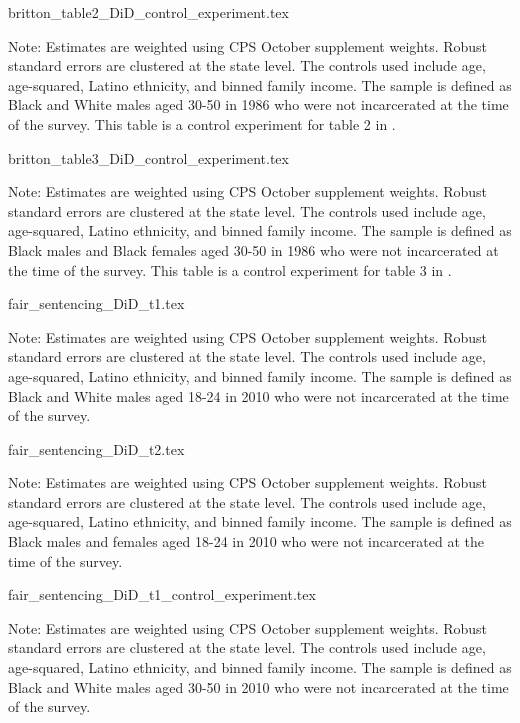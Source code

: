 \clearpage

{britton_table2_DiD_control_experiment.tex}
\begin{footnotesize}
  \noindent Note: Estimates are weighted using CPS October supplement weights. Robust standard errors are clustered at the state level. The controls used include age, age-squared, Latino ethnicity, and binned family income. The sample is defined as Black and White males aged 30-50 in 1986 who were not incarcerated at the time of the survey.
  This table is a control experiment for table 2 in \cite{britton2022}.
\end{footnotesize}

{britton_table3_DiD_control_experiment.tex}
\begin{footnotesize}
  \noindent Note: Estimates are weighted using CPS October supplement weights. Robust standard errors are clustered at the state level. The controls used include age, age-squared, Latino ethnicity, and binned family income. The sample is defined as Black males and Black females aged 30-50 in 1986 who were not incarcerated at the time of the survey.
  This table is a control experiment for table 3 in \cite{britton2022}.
\end{footnotesize}
\clearpage

{fair_sentencing_DiD_t1.tex}
\begin{footnotesize}
  \noindent Note: Estimates are weighted using CPS October supplement weights. Robust standard errors are clustered at the state level. The controls used include age, age-squared, Latino ethnicity, and binned family income. The sample is defined as Black and White males aged 18-24 in 2010 who were not incarcerated at the time of the survey.
\end{footnotesize}

{fair_sentencing_DiD_t2.tex}
\begin{footnotesize}
  \noindent Note: Estimates are weighted using CPS October supplement weights. Robust standard errors are clustered at the state level. The controls used include age, age-squared, Latino ethnicity, and binned family income. The sample is defined as Black males and females aged 18-24 in 2010 who were not incarcerated at the time of the survey.
\end{footnotesize}
\clearpage

{fair_sentencing_DiD_t1_control_experiment.tex}
\begin{footnotesize}
  \noindent Note: Estimates are weighted using CPS October supplement weights. Robust standard errors are clustered at the state level. The controls used include age, age-squared, Latino ethnicity, and binned family income. The sample is defined as Black and White males aged 30-50 in 2010 who were not incarcerated at the time of the survey.
\end{footnotesize}

